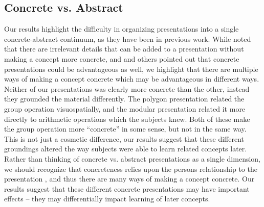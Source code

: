 \documentclass[man,10pt]{apa6}
\begin{document}
\subsection{Concrete vs. Abstract}
Our results highlight the difficulty in organizing presentations into a single concrete-abstract continuum, as they have been in previous work. While  noted that there are irrelevant details that can be added to a presentation without making a concept more concrete, and  and others pointed out that concrete presentations could be advantageous as well, we highlight that there are multiple ways of making a concept concrete which may be advantageous in different ways. Neither of our presentations was clearly more concrete than the other, instead they grounded the material differently. The polygon presentation related the group operation visuospatially, and the modular presentation related it more directly to arithmetic operations which the subjects knew. Both of these make the group operation more ``concrete'' in some sense, but not in the same way. This is not just a cosmetic difference, our results suggest that these different groundings altered the way subjects were able to learn related concepts later. Rather than thinking of concrete vs. abstract presentations as a single dimension, we should recognize that concreteness relies upon the persons relationship to the presentation \cite{Wilensky1991}, and thus there are many ways of making a concept concrete. Our results suggest that these different concrete presentations may have important effects -- they may differentially impact learning of later concepts. \par
\end{document}
